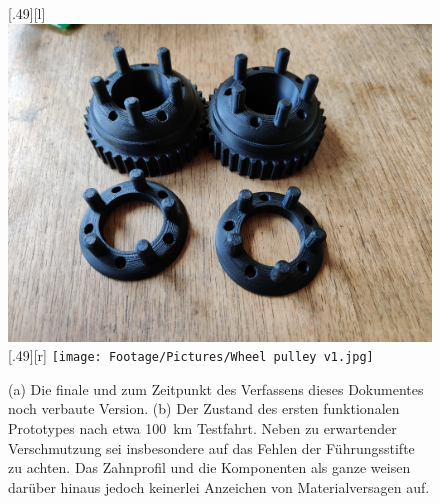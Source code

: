 		\begin{figure}[h]
			\centering
			[.49\textwidth][l]{
				\includegraphics[angle=180, width=.49\textwidth]{Footage/Pictures/Wheel pulley v2.jpg}
			}
			[.49\textwidth][r]{
				\texttt{[image: Footage/Pictures/Wheel pulley v1.jpg]}
			}
			\caption[Vergleich der gedruckten Zahn- und Konterscheiben vor und nach mehreren Testfahrten]{(a) Die finale und zum Zeitpunkt des Verfassens dieses Dokumentes noch verbaute Version. (b) Der Zustand des ersten funktionalen Prototypes nach etwa \qty{100}{\kilo\metre} Testfahrt. Neben zu erwartender Verschmutzung sei insbesondere auf das Fehlen der Führungsstifte zu achten. Das Zahnprofil und die Komponenten als ganze weisen darüber hinaus jedoch keinerlei Anzeichen von Materialversagen auf.}
			\label{fig:comparison printed parts used unused}
		\end{figure}